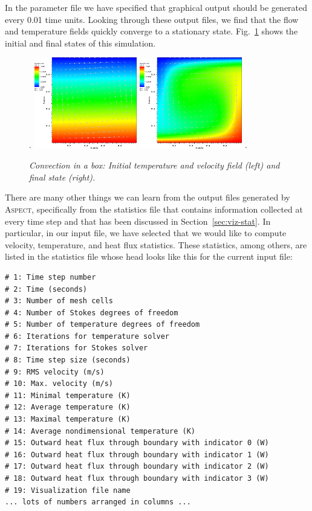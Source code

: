 \documentclass{article}
\newcommand{\aspect}{\textsc{Aspect}}
\begin{document}
In the parameter file we have specified that graphical output should be
generated every 0.01 time units. Looking through these output files, we find
that the flow and temperature fields quickly converge to a stationary state.
Fig.~\ref{fig:convection-box-fields} shows the initial and final states of this
simulation.

\begin{figure}
\phantom.
\hfill
\includegraphics[width=0.4\textwidth]{cookbooks/convection-box/visit0000}
\hfill
\includegraphics[width=0.4\textwidth]{cookbooks/convection-box/visit0001}
\hfill
\phantom.
\caption{\it Convection in a box: Initial temperature and velocity field (left)
and final state (right).}
\label{fig:convection-box-fields}
\end{figure}

There are many other things we can learn from the output files generated by
\aspect{}, specifically from the statistics file that contains information
collected at every time step and that has been discussed in
Section~\ref{sec:viz-stat}. In particular, in our input file, we have selected
that we would like to compute velocity, temperature, and heat flux statistics.
These statistics, among others, are listed in the statistics file whose head
looks like this for the current input file:
\begin{lstlisting}[frame=single,language=prmfile]
# 1: Time step number
# 2: Time (seconds)
# 3: Number of mesh cells
# 4: Number of Stokes degrees of freedom
# 5: Number of temperature degrees of freedom
# 6: Iterations for temperature solver
# 7: Iterations for Stokes solver
# 8: Time step size (seconds)
# 9: RMS velocity (m/s)
# 10: Max. velocity (m/s)
# 11: Minimal temperature (K)
# 12: Average temperature (K)
# 13: Maximal temperature (K)
# 14: Average nondimensional temperature (K)
# 15: Outward heat flux through boundary with indicator 0 (W)
# 16: Outward heat flux through boundary with indicator 1 (W)
# 17: Outward heat flux through boundary with indicator 2 (W)
# 18: Outward heat flux through boundary with indicator 3 (W)
# 19: Visualization file name
... lots of numbers arranged in columns ...
\end{lstlisting}
\end{document}
